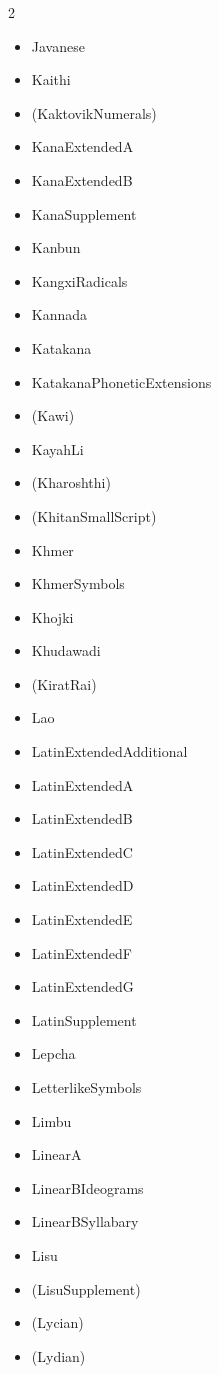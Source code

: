 \documentclass{article}
\newenvironment{itemlist}{%
  \begin{itemize}
  \setlength{\itemsep}{0pt}
  \setlength{\parsep}{0pt}
  \setlength{\topsep}{0pt}
  \setlength{\partopsep}{0pt}
  \setlength{\parskip}{0pt}
  \setlength{\labelsep}{5pt}}%
{
  \end{itemize}}
\begin{document}
\begin{multicols*}{2}
\begin{itemlist}
        \item Javanese
        \item Kaithi
        \item (KaktovikNumerals)
        \item KanaExtendedA
        \item KanaExtendedB
        \item KanaSupplement
        \item Kanbun
        \item KangxiRadicals
        \item Kannada
        \item Katakana
        \item KatakanaPhoneticExtensions
        \item (Kawi)
        \item KayahLi
        \item (Kharoshthi)
        \item (KhitanSmallScript)
        \item Khmer
        \item KhmerSymbols
        \item Khojki
        \item Khudawadi
        \item (KiratRai)
        \item Lao
        \item LatinExtendedAdditional
        \item LatinExtendedA
        \item LatinExtendedB
        \item LatinExtendedC
        \item LatinExtendedD
        \item LatinExtendedE
        \item LatinExtendedF
        \item LatinExtendedG
        \item LatinSupplement
        \item Lepcha
        \item LetterlikeSymbols
        \item Limbu
        \item LinearA
        \item LinearBIdeograms
        \item LinearBSyllabary
        \item Lisu
        \item (LisuSupplement)
        \item (Lycian)
        \item (Lydian)

\end{itemlist}
\end{multicols*}
\end{document}
